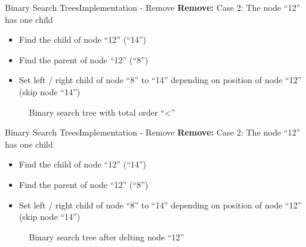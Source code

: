 \begin{frame}{Binary Search Trees}{Implementation - Remove}
  \textbf{Remove:} Case 2: The node \enquote{12} has one child\\
  \begin{itemize}
    \item<2->
      Find the {\color{Mittel-Blau}child} of node \enquote{12} (\enquote{14})
    \item<3->
      Find the {\color{Mittel-Blau}parent} of node \enquote{12} (\enquote{8})
    \item<4->
      Set left / right {\color{Mittel-Blau}child} of node \enquote{8} to
      \enquote{14} depending on position of node \enquote{12}
      (skip node \enquote{14})
  \end{itemize}
  \vspace{-0.5em}
  \begin{figure}
    
    \vspace{-0.75em}
    \caption{Binary search tree with total order
      \enquote{\color{Mittel-Blau}<}}
    \label{fig:binary_search_trees:binary_tree_remove_one_child}
  \end{figure}
\end{frame}


\begin{frame}{Binary Search Trees}{Implementation - Remove}
  \textbf{Remove:} Case 2: The node \enquote{12} has one child\\
  \begin{itemize}
    \item
      Find the {\color{Mittel-Blau}child} of node \enquote{12} (\enquote{14})
    \item
      Find the {\color{Mittel-Blau}parent} of node \enquote{12} (\enquote{8})
    \item
      Set left / right {\color{Mittel-Blau}child} of node \enquote{8} to
      \enquote{14} depending on position of node \enquote{12}
      (skip node \enquote{14})
  \end{itemize}
  \vspace{-0.5em}
  \begin{figure}
    
    \vspace{-0.75em}
    \caption{Binary search tree after delting node \enquote{12}}
    \label{fig:binary_search_trees:binary_tree_remove_one_child_result}
  \end{figure}
\end{frame}


